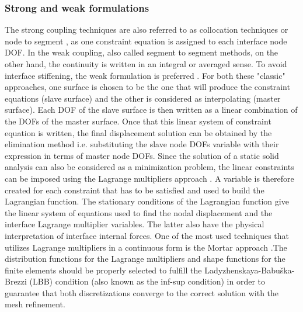  \subsubsection{Strong and weak formulations}
  The strong coupling techniques are also referred to as collocation techniques \cite{rixen1997substructuring,aminpour1995coupled} or node to segment \cite{wriggers1995finite}, as one constraint equation is assigned to each interface node DOF. In the weak coupling, also called segment to segment \cite{wriggers1995finite} methods, on the other hand, the continuity is written in an integral or averaged sense. To avoid interface stiffening, the weak formulation is preferred \cite{aminpour1995coupled,fish1995iterative}. 
 For both these "classic" approaches, one surface is chosen to be the one that will produce the constraint equations (slave surface) and the other is considered as interpolating (master surface). Each DOF of the slave surface is then written as a linear combination of the DOFs of the master surface. Once that this linear system of constraint equation is written, the final displacement solution can be obtained by the elimination method \cite{barlow1982constraint} i.e. substituting the slave node DOFs variable with their expression in terms of master node DOFs. Since the solution of a static solid analysis can also be considered as a minimization problem, the linear constraints can be imposed using the Lagrange multipliers approach \cite{bertsekas2014constrained,babuvska1973finite}.  A variable is therefore created for each constraint that has to be satisfied and used to build the Lagrangian function.  The stationary conditions of the Lagrangian function give the linear system of equations used to find the nodal displacement and the interface Lagrange multiplier variables. The latter also have the physical interpretation of interface internal forces.
 One of the most used techniques that utilizes Lagrange multipliers in a continuous form is the Mortar approach \cite{bernardi1993domain,bernardi1989new,puso20043d,puso2004mortar}.The distribution functions for the Lagrange multipliers and shape functions for
 the finite elements should be properly selected to fulfill the Ladyzhenskaya-Babu\v{s}ka-Brezzi (LBB) condition (also known as the inf-sup condition) \cite{babuvska1997babuvska} in order to guarantee that both discretizations converge to the correct solution with the mesh refinement.
